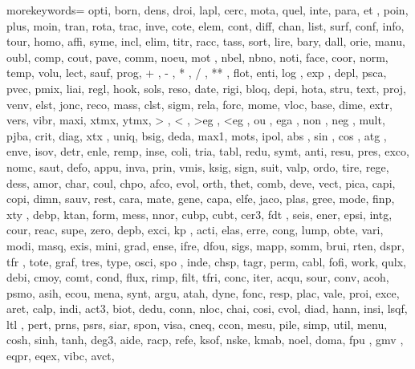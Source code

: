 \usepackage{listings}          %
{
    morekeywords={  %
        opti, born, dens, droi, lapl, cerc, mota, 
        quel, inte, para, et  , poin, plus, moin, tran,
        rota, trac, inve, cote, elem, cont, diff, chan, list,
        surf, conf, info, tour, homo, affi, syme, incl, elim,
        titr, racc, tass, sort, lire, bary, dall, orie, manu,
        oubl, comp, cout, pave, comm, noeu, mot , nbel, nbno,
        noti, face, coor, norm, temp, volu, lect, sauf, prog,
        +   , -   , *   , /   , **  , flot, enti, log , exp ,
        depl, psca, pvec, pmix, liai, regl, hook, sols, reso,
        date, rigi, bloq, depi, hota, stru, text, proj, venv,
        elst, jonc, reco, mass, clst, sigm, rela, forc, mome,
        vloc, base, dime, extr, vers, vibr, maxi, xtmx, ytmx,
        >   , <   , >eg , <eg , ou  , ega , non , neg , mult,
        pjba, crit, diag, xtx , uniq, bsig, deda, max1, mots,
        ipol, abs , sin , cos ,
        atg , enve, isov, detr, enle, remp, inse, coli, tria,
        tabl, redu, symt, anti, resu, pres, exco, nomc, saut,
        defo, appu, inva, prin, vmis, ksig, sign, suit, 
        valp, ordo, tire, rege, dess, amor, char, coul, chpo,
        afco, evol, orth, thet, comb, deve, vect, pica, capi, 
        copi, dimn, sauv, rest, cara, mate, gene,
        capa, elfe, jaco, plas, gree, mode, finp, xty ,
        debp, ktan, form, mess, nnor, cubp, cubt, cer3, fdt ,
        seis, ener, epsi, intg, cour, reac, supe, zero, depb,
        exci, kp  , acti, elas, erre, cong, lump, obte,
        vari, modi, masq, exis, mini, grad, ense, ifre, dfou,
        sigs, mapp, somm, brui, rten, dspr, tfr , tote,
        graf, tres, type, osci, spo , inde, chsp,
        tagr, perm, cabl, fofi, work, qulx, debi, 
        cmoy, comt, cond, flux, rimp, filt, tfri,
        conc, iter, acqu, sour, conv, acoh, psmo, asih, ecou,
        mena, synt, argu, atah, dyne, fonc, resp, plac,
        vale, proi, exce, aret, calp, indi, act3, biot,
        dedu, conn, nloc, chai, cosi, cvol, diad, hann, insi,
        lsqf, ltl , pert, prns, psrs, siar, spon, visa, cneq,
        ccon, mesu, pile, simp, util, menu, cosh, sinh, tanh,
        deg3, aide, racp, refe, ksof, nske, kmab,
        noel, doma, fpu , gmv , eqpr, eqex, vibc, avct,
}}
